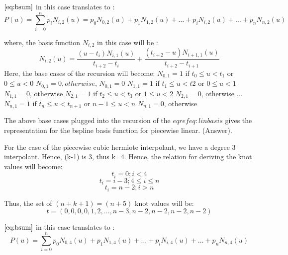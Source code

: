 \documentclass{article}
\begin{document}
$\eqref{eq:bsum}$ in this case translates to : \newline
\[ P(u) = \sum_{i=0}^n p_i N_{i,2}(u) = p_0 N_{0,2}(u) + p_1 N_{1,2}(u) + \dots + p_i N_{i,2}(u) + \dots + p_n N_{n,2}(u) \]

where, the basis function $N_{i,2}$ in this case will be : \newline
\begin{equation}
   N_{i,2}(u) = \dfrac{(u - t_i) N_{i,1}(u)}{t_{i+2} - t_i} + \dfrac{(t_{i+2} - u)N_{i+1,1}(u)}{t_{i+2} - t_{i+1}}
   \label{eq:linbasis}
\end{equation}
Here, the base cases of the recursion will become: \newline
$N_{0,1} = 1 $ if $t_0 \leq u < t_1 $ or $0 \leq u < 0$ \newline
$N_{0,1} = 0, otherwise$, \newline
$N_{0,1} = 0$ \newline \newline
$N_{1,1} = 1$ if $t_1 \leq u < t2$ or $0 \leq u < 1$ \newline
$N_{1,1} = 0$, otherwise \newline \newline
$N_{2,1} = 1$ if $t_2 \leq u < t_3$ or $1 \leq u < 2$ \newline
$N_{2,1} = 0$, otherwise \newline \newline
$\dots$ \newline
$N_{n,1} = 1$ if $t_n \leq u < t_{n+1}$ or $n-1 \leq u < n$  \newline
$N_{n,1} = 0$, otherwise \newline \newline

The above base cases plugged into the recursion of the $eqref{eq:linbasis}$ gives the representation for the bspline basis function for piecewise linear. (Answer). \newline

For the case of the piecewise cubic hermiote interpolant, we have a degree 3 interpolant. Hence, (k-1) is 3, thus k=4. Hence, the relation for deriving the knot values will become: \newline
\[ t_i = 0; i < 4\]
\[ t_i = i-3; 4 \leq i \leq n \]
\[ t_i = n-2; i > n\]

Thus, the set of $(n+k+1) = (n+5)$ knot values will be: \newline
\[ t = (0,0,0,0,1,2, \dots, n-3, n-2,n-2,n-2,n-2)\]

$\eqref{eq:bsum}$ in this case translates to : \newline
\begin{equation}
 P(u) = \sum_{i=0}^n p_0 N_{0,4}(u) + p_1 N_{1,4}(u) + \dots + p_i N_{i,4}(u) + \dots + p_n N_{n,4}(u) 
 \label{eq:cubasis}
\end{equation}
\end{document}
